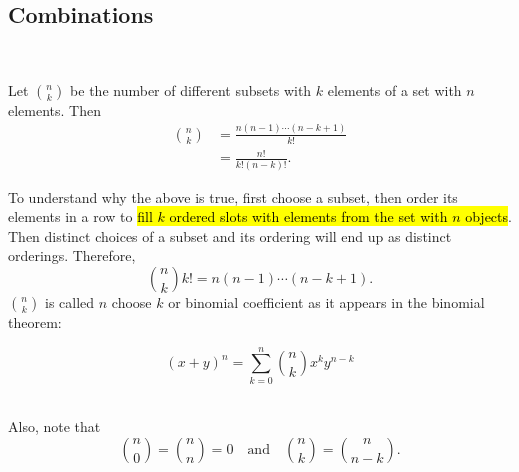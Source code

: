 \documentclass[12pt,a4paper]{article}
\theoremstyle{definition}
\theoremstyle{definition}
\theoremstyle{definition}
\theoremstyle{definition}
\theoremstyle{remark}
\theoremstyle{definition}
\newcommand{\dispsty}{\displaystyle}
\begin{document}
\subsection{Combinations}
\
\begin{tcolorbox}[colback=white]
	Let $\dispsty\binom{n}{k}$ be the number of different subsets with $k$ elements of a set with $n$ elements. Then \begin{align*}
	\binom{n}{k}&=\frac{n(n-1)\cdots(n-k+1)}{k!}\\
	&=\frac{n!}{k!(n-k)!}.
	\end{align*}
\end{tcolorbox} To understand why the above is true, first choose a subset, then order its elements in a row to \hl{fill $k$ ordered slots with elements from the set with $n$ objects}. Then distinct choices of a subset and its ordering will end up as distinct orderings. Therefore, \[
\binom{n}{k}k!=n(n-1)\cdots(n-k+1).
\] $\dispsty\binom{n}{k}$ is called $n$ choose $k$ or binomial coefficient as it appears in the binomial theorem:\begin{tcolorbox}[colback=white]
	 \[(x+y)^n=\sum_{k=0}^n\binom{n}{k}x^ky^{n-k}\]
\end{tcolorbox}\
\\
Also, note that \[
\binom{n}{0}=\binom{n}{n}=0\quad\text{and}\quad\binom{n}{k}=\binom{n}{n-k}.
\]
\end{document}
